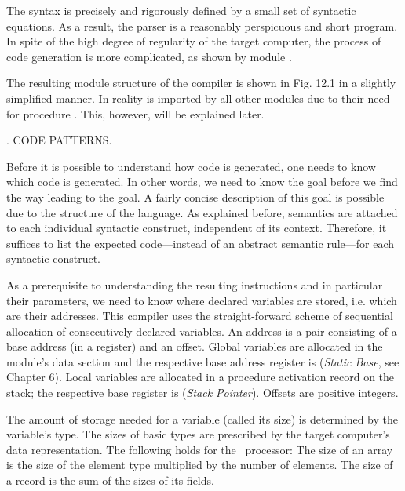 The syntax is precisely and rigorously defined by a small set of syntactic equations. As a result, the parser is a reasonably perspicuous and short program. In spite of the high degree of regularity of the target computer, the process of code generation is more complicated, as shown by module .

The resulting module structure of the compiler is shown in Fig. 12.1 in a slightly simplified manner. In reality  is imported by all other modules due to their need for procedure . This, however, will be explained later.


. CODE PATTERNS.

Before it is possible to understand how code is generated, one needs to know which code is generated. In other words, we need to know the goal before we find the way leading to the goal. A fairly concise description of this goal is possible due to the structure of the language. As explained before, semantics are attached to each individual syntactic construct, independent of its context. Therefore, it suffices to list the expected code---instead of an abstract semantic rule---for each syntactic construct.

As a prerequisite to understanding the resulting instructions and in particular their parameters, we need to know where declared variables are stored, i.e. which are their addresses. This compiler uses the straight-forward scheme of sequential allocation of consecutively declared variables. An address is a pair consisting of a base address (in a register) and an offset. Global variables are allocated in the module's data section and the respective base address register is  (\emph{Static Base}, see Chapter 6). Local variables are allocated in a procedure activation record on the stack; the respective base register is  (\emph{Stack Pointer}). Offsets are positive integers.

The amount of storage needed for a variable (called its size) is determined by the variable's type. The sizes of basic types are prescribed by the target computer's data representation. The following holds for the \RISC\ processor:
\noindent The size of an array is the size of the element type multiplied by the number of elements. The size of a record is the sum of the sizes of its fields.


